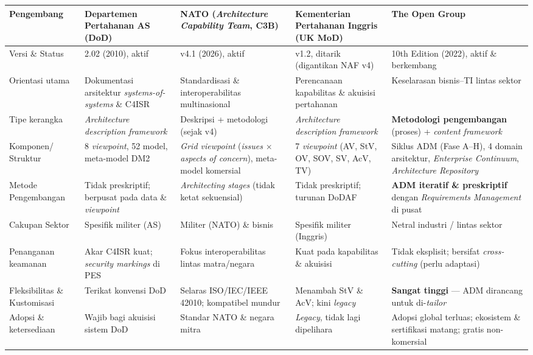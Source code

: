 {\begin{longtable}{|p{2.1cm}|p{2.5cm}|p{2.5cm}|p{2.5cm}|p{2.5cm}|}
Pengembang & Departemen Pertahanan AS (DoD) & NATO (\textit{Architecture Capability Team}, C3B) & Kementerian Pertahanan Inggris (UK MoD) & The Open Group \\
\hline
Versi \& Status & 2.02 (2010), aktif & v4.1 (2026), aktif & v1.2, ditarik (digantikan NAF v4) & 10th Edition (2022), aktif \& berkembang \\
\hline
Orientasi utama & Dokumentasi arsitektur \textit{systems-of-systems} \& C4ISR & Standardisasi \& interoperabilitas multinasional & Perencanaan kapabilitas \& akuisisi pertahanan & Keselarasan bisnis--TI lintas sektor \\
\hline
Tipe kerangka & \textit{Architecture description framework} & Deskripsi + metodologi (sejak v4) & \textit{Architecture description framework} & \textbf{Metodologi pengembangan} (proses) + \textit{content framework} \\
\hline
Komponen/ Struktur & 8 \textit{viewpoint}, 52 model, meta-model DM2 & \textit{Grid viewpoint} (\textit{issues} $\times$ \textit{aspects of concern}), meta-model komersial & 7 \textit{viewpoint} (AV, StV, OV, SOV, SV, AcV, TV) & Siklus ADM (Fase A--H), 4 domain arsitektur, \textit{Enterprise Continuum}, \textit{Architecture Repository} \\
\hline
Metode Pengembangan & Tidak preskriptif; berpusat pada data \& \textit{viewpoint} & \textit{Architecting stages} (tidak ketat sekuensial) & Tidak preskriptif; turunan DoDAF & \textbf{ADM iteratif \& preskriptif} dengan \textit{Requirements Management} di pusat \\
\hline
Cakupan Sektor & Spesifik militer (AS) & Militer (NATO) \& bisnis & Spesifik militer (Inggris) & Netral industri / lintas sektor \\
\hline
Penanganan keamanan & Akar C4ISR kuat; \textit{security markings} di PES & Fokus interoperabilitas lintas matra/negara & Kuat pada kapabilitas \& akuisisi & Tidak eksplisit; bersifat \textit{cross-cutting} (perlu adaptasi) \\
\hline
Fleksibilitas \& Kustomisasi & Terikat konvensi DoD & Selaras ISO/IEC/IEEE 42010; kompatibel mundur & Menambah StV \& AcV; kini \textit{legacy} & \textbf{Sangat tinggi} --- ADM dirancang untuk di-\textit{tailor} \\
\hline
Adopsi \& ketersediaan & Wajib bagi akuisisi sistem DoD & Standar NATO \& negara mitra & \textit{Legacy}, tidak lagi dipelihara & Adopsi global terluas; ekosistem \& sertifikasi matang; gratis non-komersial \\
\hline
\end{longtable}
}

